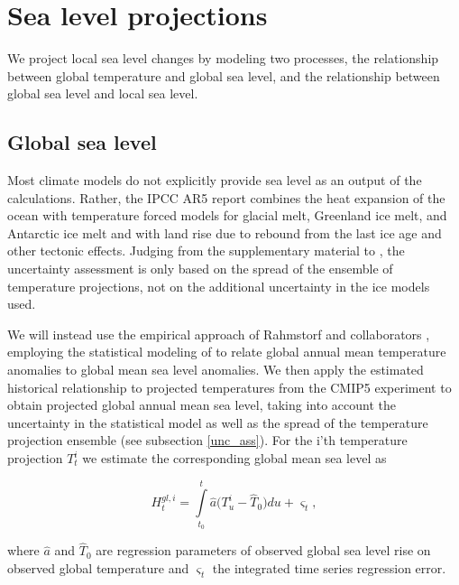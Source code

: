 \documentclass[draft,linenumbers]{agujournal}
\begin{document}
\section{Sea level projections}
\label{sealevelproj}

We project local sea level changes by modeling two processes, the relationship between global temperature and global sea level, and the relationship between global sea level and local sea level.

\subsection{Global sea level}
Most climate models do not explicitly provide sea level as an output of the calculations. Rather, the IPCC AR5 report \citep[ch.~13]{ipcc} combines the heat expansion of the ocean with temperature forced models for glacial melt, Greenland ice melt, and Antarctic ice melt and with land rise due to rebound from the last ice age and other tectonic effects. Judging from the supplementary material to \citet[ch.~13]{ipcc}, the uncertainty assessment is only based on the spread of the ensemble of temperature projections, not on the additional uncertainty in the ice models used.

We will instead use the empirical approach of Rahmstorf and collaborators \citep{Rahmstorf07,Rahmstorf11}, employing the statistical modeling of \citet{Bolin2014a} to relate global annual mean temperature anomalies to global mean sea level anomalies. 
We then apply the estimated historical relationship to projected temperatures from the CMIP5 experiment \citep{cmip5} to obtain projected global annual mean sea level, taking into account the uncertainty in the statistical model as well as the spread of the temperature projection ensemble (see subsection \ref{unc_ass}). 
For the i'th temperature projection $T_t^i$ we estimate the corresponding global mean sea level as
\begin{linenomath*}
\[H_t^{gl,i} = \int\limits_{{t_0}}^t {{\hat a} (T_u^i - {{\hat T}_0}} )du + {\varsigma _t},\]
\end{linenomath*}
where ${\hat a}$ and ${\hat T}_0$ are regression parameters of observed global sea level  rise on observed global temperature and $\varsigma_t$ the integrated time series regression error.
\end{document}

